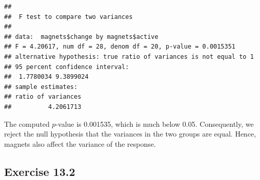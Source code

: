 \documentclass[]{krantz}
\makeatletter
\newenvironment{Shaded}{\begin{snugshade}}{\end{snugshade}}
\newcommand{\KeywordTok}[1]{\textcolor[rgb]{0.13,0.29,0.53}{\textbf{#1}}}
\newcommand{\StringTok}[1]{\textcolor[rgb]{0.31,0.60,0.02}{#1}}
\newcommand{\OperatorTok}[1]{\textcolor[rgb]{0.81,0.36,0.00}{\textbf{#1}}}
\newcommand{\NormalTok}[1]{#1}
\newenvironment{kframe}{%
\medskip{}
\setlength{\fboxsep}{.8em}
 \def\at@end@of@kframe{}%
 \ifinner\ifhmode%
  \def\at@end@of@kframe{\end{minipage}}%
  \begin{minipage}{\columnwidth}%
 \fi\fi%
 \def\FrameCommand##1{\hskip\@totalleftmargin \hskip-\fboxsep
 \colorbox{shadecolor}{##1}\hskip-\fboxsep
     \hskip-\linewidth \hskip-\@totalleftmargin \hskip\columnwidth}%
 \MakeFramed {\advance\hsize-\width
   \@totalleftmargin\z@ \linewidth\hsize
   \@setminipage}}%
 {\par\unskip\endMakeFramed%
 \at@end@of@kframe}
\renewenvironment{Shaded}{\begin{kframe}}{\end{kframe}}
\theoremstyle{definition}
\theoremstyle{definition}
\theoremstyle{definition}
\theoremstyle{remark}
\makeatother
\begin{document}
\begin{enumerate}
\begin{Shaded}
\end{Shaded}

\begin{verbatim}
## 
##  F test to compare two variances
## 
## data:  magnets$change by magnets$active
## F = 4.20617, num df = 28, denom df = 20, p-value = 0.0015351
## alternative hypothesis: true ratio of variances is not equal to 1
## 95 percent confidence interval:
##  1.7780034 9.3899024
## sample estimates:
## ratio of variances 
##          4.2061713
\end{verbatim}

  The computed \(p\)-value is 0.001535, which is much below 0.05.
  Consequently, we reject the null hypothesis that the variances in the
  two groups are equal. Hence, magnets also affect the variance of the
  response.
\end{enumerate}

\subsection*{Exercise 13.2}\label{exercise-13.2}
\end{document}
